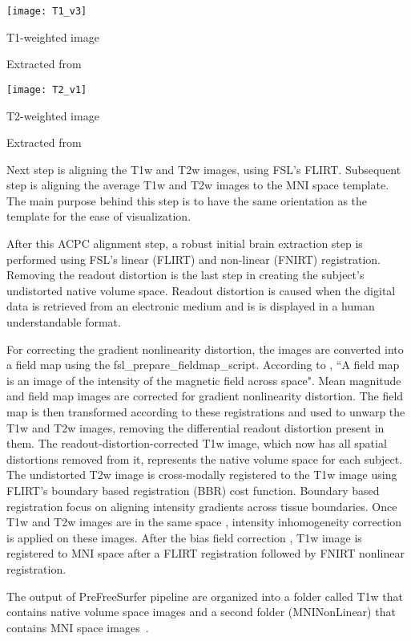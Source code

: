 \begin{center}
  \texttt{[image: T1\_v3]}
  \caption{T1-weighted image}
  \label{fig:T1w}
  \caption*{Extracted from \cite{t1w_t2w}}
\end{center}

\begin{center}
  \texttt{[image: T2\_v1]}
  \caption{T2-weighted image}
  \label{fig:T2w}
  \caption*{Extracted from \cite{t1w_t2w}}
\end{center}

Next step is aligning the T1w and T2w images, using FSL's FLIRT. Subsequent step is aligning the average T1w and T2w images to the MNI space template. The main purpose behind this step is to have the same orientation as the template for the ease of visualization.

After this ACPC alignment step, a robust initial brain extraction step is performed using FSL's linear (FLIRT) and non-linear (FNIRT) registration. Removing the readout distortion is the last step in creating the subject's undistorted native volume space. Readout distortion is caused when the digital data is retrieved from an electronic medium and is is displayed in a human understandable format.

For correcting the gradient nonlinearity distortion, the images are converted into a field map using the fsl\_prepare\_fieldmap\_script. According to \cite{field_map}, ``A field map is an image of the intensity of the magnetic field across space". Mean magnitude and field map images are corrected for gradient nonlinearity distortion. The field map is then transformed according to these registrations and used to unwarp the T1w and T2w images, removing the differential readout distortion present in them. The readout-distortion-corrected T1w image, which now has all spatial distortions removed from it, represents the native volume space for each subject. The undistorted T2w image is cross-modally registered to the T1w image using FLIRT's boundary based registration (BBR) cost function. Boundary based registration focus on aligning intensity gradients across tissue boundaries. Once T1w and T2w images are in the same space , intensity inhomogeneity correction is applied on these images. After the bias field correction , T1w image is registered to MNI space after a FLIRT registration followed by FNIRT nonlinear registration.

The output of PreFreeSurfer pipeline are organized into a folder called T1w that contains native volume space images and a second folder (MNINonLinear) that contains MNI space images~\cite{Gla13}.

